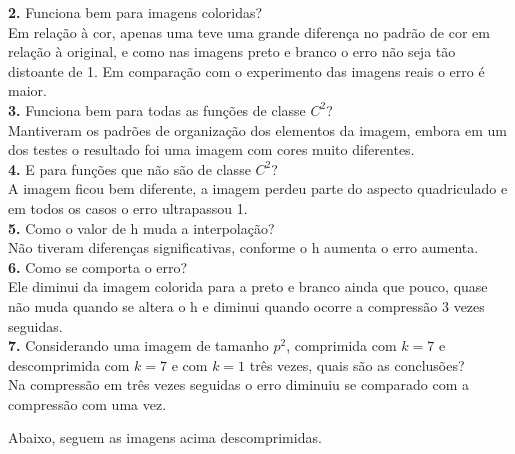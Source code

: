 \documentclass[12pt,letterpaper]{article}
\begin{document}
	\textbf{2.} Funciona bem para imagens coloridas?\\
	Em relação à cor, apenas uma teve uma grande diferença no padrão de cor em relação à original, e como nas imagens preto e branco o erro não seja tão distoante de 1. Em comparação com o experimento das imagens reais o erro é maior.\\
	
	\textbf{3.} Funciona bem para todas as funções de classe $C^2$?\\
	Mantiveram os padrões de organização dos elementos da imagem, embora em um dos testes o resultado foi uma imagem com cores muito diferentes.\\
	
	\textbf{4.} E para funções que não são de classe $C^2$? \\
	A imagem ficou bem diferente, a imagem perdeu parte do aspecto quadriculado e em todos os casos o erro ultrapassou 1.\\
	
	\textbf{5.} Como o valor de h muda a interpolação? \\
	Não tiveram diferenças significativas, conforme o h aumenta o erro aumenta.\\
	
	\textbf{6.} Como se comporta o erro?\\
	Ele diminui da imagem colorida para a preto e branco ainda que pouco, quase não muda quando se altera o h e diminui quando ocorre a compressão 3 vezes seguidas.\\
	
	\textbf{7.} Considerando uma imagem de tamanho $p^2$, comprimida com $k = 7$ e descomprimida com $k = 7$ e com $k = 1$ três vezes, quais são as conclusões?\\
	Na compressão em três vezes seguidas o erro diminuiu se comparado com a compressão com uma vez.
	
	Abaixo, seguem as imagens acima descomprimidas.
	
	\begin{figure}[h]
	\end{figure}

	
	\begin{figure}[h]
	\end{figure}
	
\end{document}
